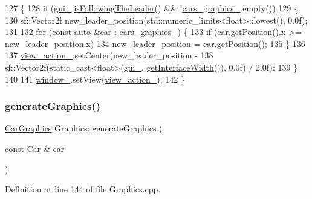 \begin{DoxyCode}
127                                \{
128     \textcolor{keywordflow}{if} (\hyperlink{classGraphics_ac582857f6b0de010eabd0146c4a5f4d2}{gui\_}.\hyperlink{classGraphicalUserInterface_a9aa8920f70bf99225a7e8e4ff9cb5e3f}{isFollowingTheLeader}() && !\hyperlink{classGraphics_a8be356ffe3ee47f915027361b6ae34ab}{cars\_graphics\_}.empty())
129     \{
130         sf::Vector2f new\_leader\_position(std::numeric\_limits<float>::lowest(), 0.0f);
131 
132         \textcolor{keywordflow}{for} (\textcolor{keyword}{const} \textcolor{keyword}{auto} &car : \hyperlink{classGraphics_a8be356ffe3ee47f915027361b6ae34ab}{cars\_graphics\_}) \{
133             \textcolor{keywordflow}{if} (car.getPosition().x >= new\_leader\_position.x)
134                 new\_leader\_position = car.getPosition();
135         \}
136 
137         \hyperlink{classGraphics_a60792a296f5e93dbd1d086398e20cbd0}{view\_action\_}.setCenter(new\_leader\_position -
138                                sf::Vector2f(static\_cast<float>(\hyperlink{classGraphics_ac582857f6b0de010eabd0146c4a5f4d2}{gui\_}.
      \hyperlink{classGraphicalUserInterface_a6b168726ffb57ba7d06946d27435abad}{getInterfaceWidth}()), 0.0f) / 2.0f);
139     \}
140 
141     \hyperlink{classGraphics_ac760fe1abb0b648844c9f15afa087ef6}{window\_}.setView(\hyperlink{classGraphics_a60792a296f5e93dbd1d086398e20cbd0}{view\_action\_});
142 \}
\end{DoxyCode}
\mbox{\label{classGraphics_a504c1b9aa359dbe8b05f8879c1045610}} 
\subsubsection{\texorpdfstring{generate\+Graphics()}{generateGraphics()}}
{\footnotesize\ttfamily \hyperlink{classCarGraphics}{Car\+Graphics} Graphics\+::generate\+Graphics (\begin{DoxyParamCaption}\item[{const \hyperlink{classCar}{Car} \&}]{car }\end{DoxyParamCaption})\hspace{0.3cm}{\ttfamily [private]}}



Definition at line 144 of file Graphics.\+cpp.


